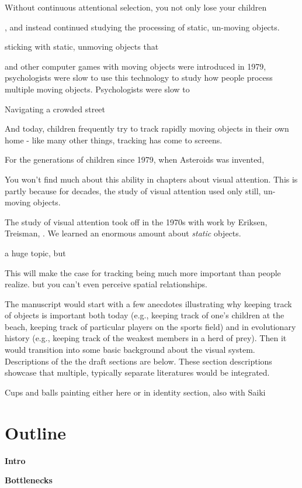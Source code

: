 \documentclass[]{book}
\begin{document}
Without continuous attentional selection, you not only lose your children

, and instead continued studying the processing of static, un-moving objects.

sticking with static, unmoving objects that

and other computer games with moving objects were introduced in 1979, psychologists were slow to use this technology to study how people process multiple moving objects.
Psychologists were slow to

Navigating a crowded street

And today, children frequently try to track rapidly moving objects in their own home - like many other things, tracking has come to screens.

For the generations of children since 1979, when Asteroids was invented,

You won't find much about this ability in chapters about visual attention. This is partly because for decades, the study of visual attention used only still, un-moving objects.

The study of visual attention took off in the 1970s with work by Eriksen, Treisman, . We learned an enormous amount about \emph{static} objects.

a huge topic, but

This will make the case for tracking being much more important than people realize. but you can't even perceive spatial relationships.

The manuscript would start with a few anecdotes illustrating why keeping track of objects is important both today (e.g., keeping track of one's children at the beach, keeping track of particular players on the sports field) and in evolutionary history (e.g., keeping track of the weakest members in a herd of prey). Then it would transition into some basic background about the visual system. Descriptions of the the draft sections are below. These section descriptions showcase that multiple, typically separate literatures would be integrated.

Cups and balls painting either here or in identity section, also with Saiki

\hypertarget{outline}{%
\section{Outline}\label{outline}}

\textbf{Intro}

\textbf{Bottlenecks}
\end{document}
